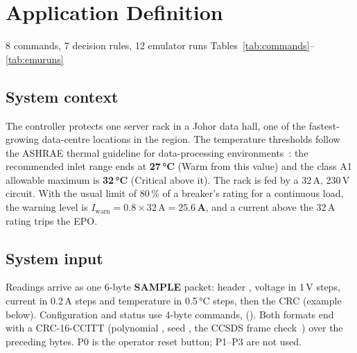 \section{Application Definition}\label{sec:app}
  {8 commands, 7 decision rules, 12 emulator runs}
  {Tables~\ref{tab:commands}–\ref{tab:emuruns}}

\subsection{System context}\label{sec:context}
The controller protects one server rack in a Johor data hall, one of the fastest-growing data-centre locations in the region. The temperature thresholds follow the ASHRAE thermal guideline for data-processing environments~\cite{ashrae}: the recommended inlet range ends at \textbf{27\,°C} (Warm from this value) and the class A1 allowable maximum is \textbf{32\,°C} (Critical above it). The rack is fed by a 32\,A, 230\,V circuit. With the usual limit of 80\,\% of a breaker's rating for a continuous load, the warning level is $I_{\text{warn}} = 0.8 \times 32\,\mathrm{A} = \mathbf{25.6\,A}$, and a current above the 32\,A rating trips the EPO.

\subsection{System input}\label{sec:input}
Readings arrive as one 6-byte \textbf{SAMPLE} packet: header , voltage in 1\,V steps, current in 0.2\,A steps and temperature in 0.5\,°C steps, then the CRC (example below). Configuration and status use 4-byte commands, \code{[CMD]\allowbreak[DATA]\allowbreak[CRC\_LO]\allowbreak[CRC\_HI]} (). Both formats end with a CRC-16-CCITT (polynomial , seed , the CCSDS frame check~\cite{ccsds}) over the preceding bytes. P0 is the operator reset button; P1–P3 are not used.

